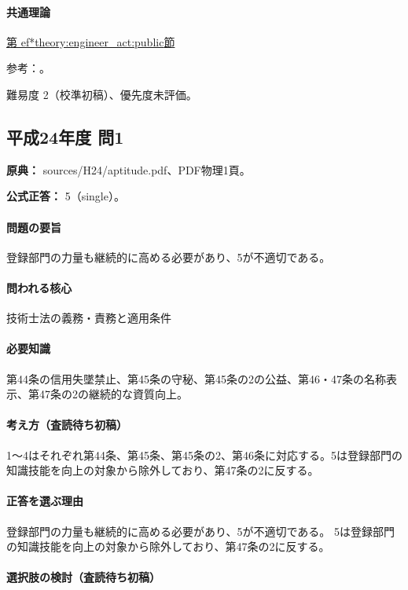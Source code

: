 \paragraph{共通理論} \hyperref[theory:engineer_act:public]{第
ef*{theory:engineer_act:public}節}

\par 参考：\cite{engineer_act_current,cpd_v3}。

\par 難易度 2（校準初稿）、優先度未評価。

\subsection{平成24年度 問1}
\label{q:h24-reg-apt-01}

\noindent\textbf{原典：} sources/H24/aptitude.pdf、PDF物理1頁。

\textbf{公式正答：} 5（single）。

\paragraph{問題の要旨} 登録部門の力量も継続的に高める必要があり、5が不適切である。

\paragraph{問われる核心} 技術士法の義務・責務と適用条件

\paragraph{必要知識} 第44条の信用失墜禁止、第45条の守秘、第45条の2の公益、第46・47条の名称表示、第47条の2の継続的な資質向上。

\paragraph{考え方（査読待ち初稿）} 1～4はそれぞれ第44条、第45条、第45条の2、第46条に対応する。5は登録部門の知識技能を向上の対象から除外しており、第47条の2に反する。

\paragraph{正答を選ぶ理由} 登録部門の力量も継続的に高める必要があり、5が不適切である。 5は登録部門の知識技能を向上の対象から除外しており、第47条の2に反する。

\paragraph{選択肢の検討（査読待ち初稿）}

